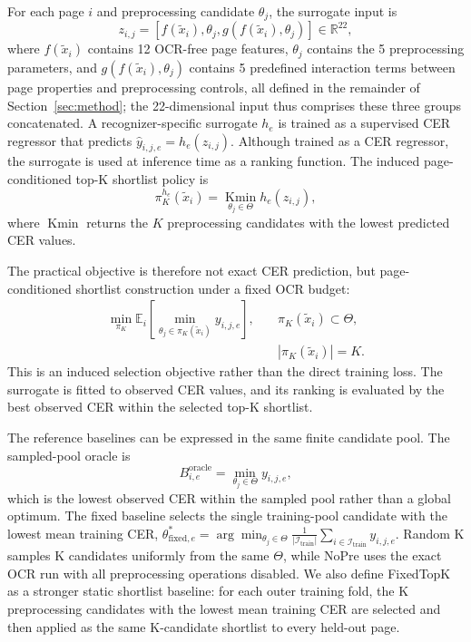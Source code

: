 \documentclass[pdflatex,sn-basic,Numbered,iicol]{sn-jnl}
\begin{document}
For each page \(i\) and preprocessing candidate \(\theta_j\), the surrogate input is
\begin{equation}
z_{i,j} =
\left[f(\tilde{x}_i), \theta_j, g(f(\tilde{x}_i),\theta_j)\right]
\in \mathbb{R}^{22},
\label{eq:surrogate_input}
\end{equation}
where \(f(\tilde{x}_i)\) contains 12 OCR-free page features, \(\theta_j\) contains the 5 preprocessing parameters, and \(g(f(\tilde{x}_i),\theta_j)\) contains 5 predefined interaction terms between page properties and preprocessing controls, all defined in the remainder of Section~\ref{sec:method}; the 22-dimensional input thus comprises these three groups concatenated. A recognizer-specific surrogate \(h_e\) is trained as a supervised CER regressor that predicts \(\hat{y}_{i,j,e}=h_e(z_{i,j})\). Although trained as a CER regressor, the surrogate is used at inference time as a ranking function. The induced page-conditioned top-K shortlist policy is
\begin{equation}
\pi^{h_e}_K(\tilde{x}_i)
=
\operatorname*{Kmin}_{\theta_j\in\Theta} h_e(z_{i,j}),
\label{eq:topk_policy}
\end{equation}
where \(\operatorname*{Kmin}\) returns the \(K\) preprocessing candidates with the lowest predicted CER values.

The practical objective is therefore not exact CER prediction, but page-conditioned shortlist construction under a fixed OCR budget:
\begin{equation}
\begin{aligned}
\min_{\pi_K}
\mathbb{E}_{i}\left[
\min_{\theta_j \in \pi_K(\tilde{x}_i)} y_{i,j,e}
\right],
&\quad
\pi_K(\tilde{x}_i)\subset\Theta,\\
&\quad
|\pi_K(\tilde{x}_i)|=K.
\end{aligned}
\label{eq:selection_objective}
\end{equation}
This is an induced selection objective rather than the direct training loss. The surrogate is fitted to observed CER values, and its ranking is evaluated by the best observed CER within the selected top-K shortlist.

The reference baselines can be expressed in the same finite candidate pool. The sampled-pool oracle is
\begin{equation}
B^{\mathrm{oracle}}_{i,e}=\min_{\theta_j\in\Theta} y_{i,j,e},
\label{eq:sampled_oracle}
\end{equation}
which is the lowest observed CER within the sampled pool rather than a global optimum. The fixed baseline selects the single training-pool candidate with the lowest mean training CER, \(\theta^{*}_{\mathrm{fixed},e}=\arg\min_{\theta_j\in\Theta}\frac{1}{|\mathcal{I}_{\mathrm{train}}|}\sum_{i\in\mathcal{I}_{\mathrm{train}}} y_{i,j,e}\). Random K samples K candidates uniformly from the same \(\Theta\), while NoPre uses the exact OCR run with all preprocessing operations disabled.
We also define FixedTopK as a stronger static shortlist baseline: for each outer training fold, the K preprocessing candidates with the lowest mean training CER are selected and then applied as the same K-candidate shortlist to every held-out page.
\end{document}
